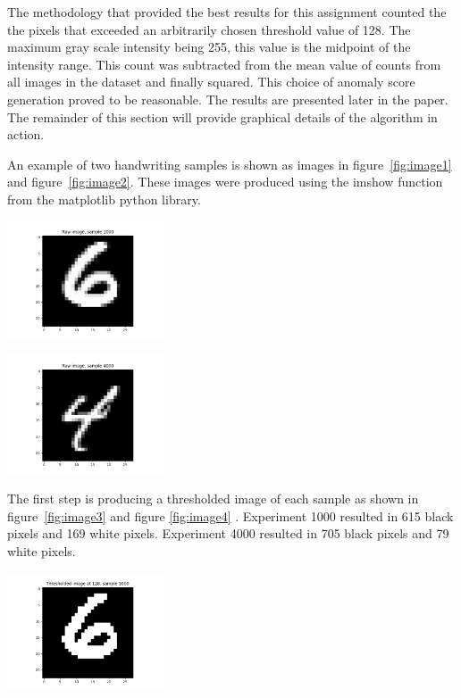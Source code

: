 The methodology that provided the best results for this assignment counted the the pixels that exceeded an arbitrarily chosen threshold value of 128. The maximum gray scale intensity being 255, this value is the midpoint of the intensity range. This count was subtracted from the mean value of counts from all images in the dataset and finally squared. This choice of anomaly score generation proved to be reasonable. The results are presented later in the paper. The remainder of this section will provide graphical details of the algorithm in action.

An example of two handwriting samples is shown as images in figure~\ref{fig:image1} and figure~\ref{fig:image2}. These images were produced using the imshow function from the matplotlib python library.\newline

\begin{center}
\includegraphics[width=0.35\textwidth]{image1.png}
\end{center}

\begin{center}
\includegraphics[width=0.35\textwidth]{image2.png}
\end{center}

The first step is producing a thresholded image of each sample as shown in figure~\ref{fig:image3} and figure \ref{fig:image4} . Experiment 1000 resulted in 615 black pixels and 169 white pixels. Experiment 4000 resulted in 705 black pixels and 79 white pixels.

\begin{center}
\includegraphics[width=0.35\textwidth]{image3.png}
\end{center}

